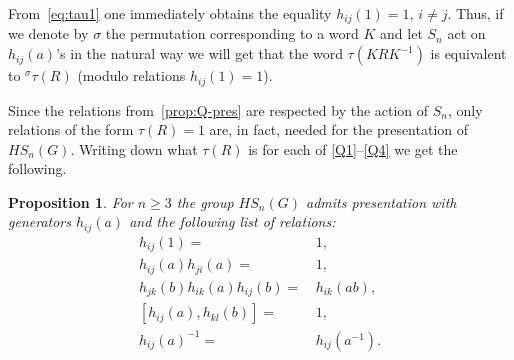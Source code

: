 \documentclass[oneside, 12pt]{amsart}
\theoremstyle{plain}
\numberwithin{equation}{section}
\numberwithin{lemma}{section}
\newtheorem{prop}[lemma]{Proposition}
\theoremstyle{remark}
\theoremstyle{definition}
\begin{document}
From~\eqref{eq:tau1} one immediately obtains the equality $h_{ij}(1)=1$, $i\neq j$.
Thus, if we denote by $\sigma$ the permutation corresponding to a word $K$ and let $S_n$ act on $h_{ij}(a)$'s in the natural way
 we will get that the word $\tau(KRK^{-1})$ is equivalent to ${}^{\sigma}\tau(R)$ (modulo relations $h_{ij}(1)=1$). 

Since the relations from~\cref{prop:Q-pres} are respected by the action of $S_n$,
 only relations of the form $\tau(R)=1$ are, in fact, needed for the presentation of $HS_n(G)$.
Writing down what $\tau(R)$ is for each of \eqref{Q1}--\eqref{Q4} we get the following.
 
\begin{prop} \label{prop:HSpres} For $n\geq 3$ the group $HS_n(G)$ admits presentation with generators $h_{ij}(a)$ and the following list of relations:
\begin{align}
h_{ij}(1)                     = &\, 1,              \tag{HS0} \label{H0} \\
h_{ij}(a) h_{ji}(a)           = &\, 1,              \tag{HS1} \label{H1} \\
h_{jk}(b) h_{ik}(a) h_{ij}(b) = &\, h_{ik}(ab),     \tag{HS2} \label{H2} \\
[h_{ij}(a), h_{kl}(b)]        = &\, 1,              \tag{HS3} \label{H3} \\
h_{ij}(a)^{-1}                = &\, h_{ij}(a^{-1}). \tag{HS4} \label{H4}
\end{align}
\end{prop}
\end{document}
